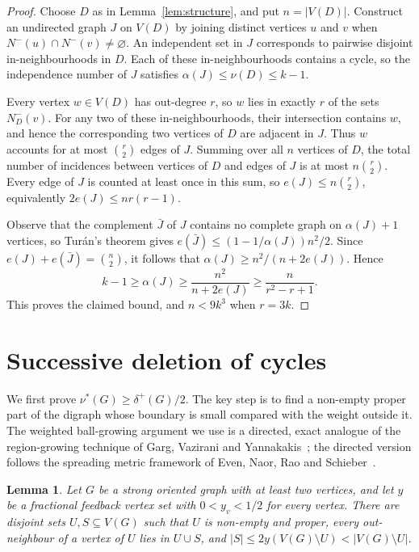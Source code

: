 \documentclass[10pt,a4paper]{article}
\newtheorem{lemma}[theorem]{Lemma}
\numberwithin{equation}{section}
\newcommand{\jbjcomment}[1]{\textcolor{blue}{JBJ: #1}}
\begin{document}
\begin{proof}
Choose $D$ as in Lemma~\ref{lem:structure}, and put $n=|V(D)|$.
Construct an undirected graph $J$ on $V(D)$ by joining distinct vertices
$u$ and $v$ when $N^-(u)\cap N^-(v)\ne\varnothing$.
An independent set in $J$ corresponds to pairwise disjoint
in-neighbourhoods in $D$. Each of these in-neighbourhoods contains
a cycle, so the independence number of $J$ satisfies
$\alpha(J)\le\nu(D)\le k-1$.

Every vertex $w\in V(D)$ has out-degree $r$, so $w$ lies in exactly $r$
of the sets $N_D^-(v)$. For any two of these in-neighbourhoods, their
intersection contains $w$, and hence the corresponding two vertices of
$D$ are adjacent in $J$. Thus $w$ accounts for at most $\binom r2$
edges of $J$. Summing over all $n$ vertices of $D$, the total number of
incidences between vertices of $D$ and edges of $J$ is at most
$n\binom r2$. Every edge of $J$ is counted at least once in this sum, so
$e(J)\le n\binom r2$, equivalently $2e(J)\le nr(r-1)$.

Observe that the complement
$\bar{J}$ of $J$ contains no complete graph on $\alpha(J)+1$ vertices, so
Tur\'an's theorem gives $e(\bar{J})\le(1-1/\alpha(J))n^2/2$.
Since $e(J)+e(\bar{J})=\binom n2$, it follows that
$\alpha(J)\ge n^2/(n+2e(J))$. Hence
$$
 k-1\ge\alpha(J)\ge\frac{n^2}{n+2e(J)}\ge\frac{n}{r^2-r+1}.
$$
This proves the claimed bound, and $n<9k^3$ when $r=3k$.
\end{proof}



\section{Successive deletion of cycles}\label{sec:iteration}


We first prove $\nu^\ast(G)\ge\delta^+(G)/2$. The key step is to find a non-empty
proper part of the digraph whose boundary  %
is small compared with the
weight outside it. The weighted ball-growing argument we use is a
directed, exact analogue of the region-growing technique of Garg,
Vazirani and Yannakakis~\cite{gargSJC25}; the directed version follows the
spreading metric framework of Even, Naor, Rao and Schieber~\cite{evenJACM47}.



\begin{lemma}\label{lem:boundary}
Let $G$ be a strong oriented graph   
with at least two vertices, and let $y$ be a
fractional feedback vertex set with $0<y_v<1/2$ for every vertex.
There are disjoint sets $U,S\subseteq V(G)$ such that $U$ is non-empty
and proper, every out-neighbour of a vertex of $U$ lies in $U\cup S$,
and $|S|\le 2y(V(G)\setminus U)< |V(G)\setminus U|$.
\end{lemma}
\end{document}
